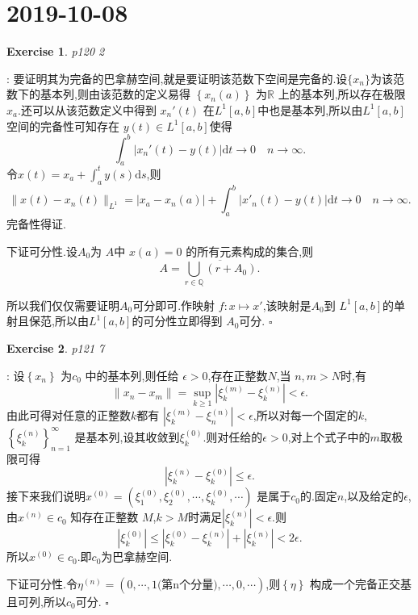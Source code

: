 \documentclass[a4paper]{article}
\newcommand\R{\ensuremath{\mathbb{R}}}
\newcommand\Q{\ensuremath{\mathbb{Q}}}
\newtheorem*{exe}{Exercise}
\newenvironment{sol}{{\noindent\bfseries Solution}:}{\hfill $\square$\par}
\begin{document}
\section{2019-10-08}
\begin{exe}
  p120 2	
\end{exe}
\begin{sol}
  要证明其为完备的巴拿赫空间,就是要证明该范数下空间是完备的.设$\{x_n\}$为该范数下的基本列,则由该范数的定义易得 $\left\{ x_n(a) \right\} $ 为$\R$ 上的基本列,所以存在极限$x_a$.还可以从该范数定义中得到 $x_n'(t)$ 在$L^1[a,b]$中也是基本列,所以由$L^1[a,b]$空间的完备性可知存在 $y(t)\in L^1[a,b]$使得
  \[
    \int_a^b \left| x_n'(t)-y(t) \right| \mathrm{d}t\to 0\quad n\to \infty
  .\] 
  令$x(t)=x_a+\int_a^t y(s)\mathrm{d}s$,则
  \[
    \|x(t)-x_n(t)\|_{L^1}= \left| x_a-x_n(a) \right| +\int_a^b\left| x'_n(t)-y(t) \right|\mathrm{d}t\to 0\quad n\to \infty 
  .\] 
  完备性得证.

  下证可分性.设$A_0$为 $A$中 $x(a)=0$ 的所有元素构成的集合,则
  \[
    A=\overline{\bigcup_{r\in \Q}\left( r+A_0 \right)}  
  .\]

所以我们仅仅需要证明$A_0$可分即可.作映射 $f:x\mapsto x'$,该映射是$A_0$到 $L^1[a,b]$的单射且保范,所以由$L^1[a,b]$的可分性立即得到 $A_0$可分.
\end{sol}
\begin{exe}
  p121 7
\end{exe}
\begin{sol}
  设$\left\{ x_n \right\} $ 为$c_0$ 中的基本列,则任给 $\epsilon >0$,存在正整数$N$,当 $n,m>N$时,有
   \[
  \|x_n-x_m\|=\sup_{k\ge 1}\left| \xi^{(m)}_k-\xi^{(n)}_k \right|<\epsilon  
  .\] 
  由此可得对任意的正整数$k$都有 $\left| \xi^{(m)}_k-\xi^{(n)}_{n} \right| <\epsilon $,所以对每一个固定的$k$, $\left\{ \xi^{(n)}_k \right\}_{n=1}^{\infty} $ 是基本列,设其收敛到$\xi_k^{(0)}$.则对任给的$\epsilon >0$,对上个式子中的$m$取极限可得
   \[
  \left| \xi_k^{(n)}-\xi_k^{(0)} \right| \le \epsilon 
  .\]
  接下来我们说明$x^{(0)}=\left( \xi^{(0)}_1,\xi^{(0)}_2,\cdots,\xi^{(0)}_k,\cdots \right) $ 是属于$c_0$的.固定$n$,以及给定的$\epsilon $,由$x^{(n)}\in c_0$ 知存在正整数 $M$,$k>M$时满足$\left| \xi_k^{(n)} \right| <\epsilon $.则
  \[
  \left| \xi^{(0)}_k \right| \le \left| \xi^{(0)}_k-\xi^{(n)}_k \right| +\left| \xi^{(n)}_k \right| <2\epsilon 
  .\] 
  所以$x^{(0)}\in c_0$.即$c_0$为巴拿赫空间.
  
  下证可分性.令$\eta^{(n)}=\left( 0,\cdots,1\text{(第n个分量)},\cdots,0,\cdots \right) $,则$\left\{ \eta \right\} $ 构成一个完备正交基且可列,所以$c_0$可分.
\end{sol}
\end{document}
